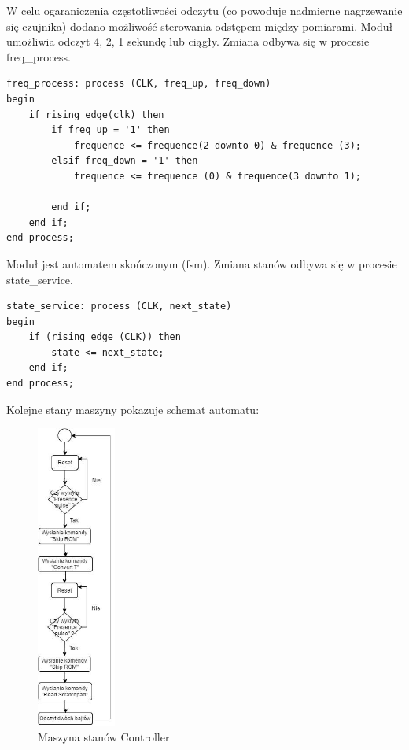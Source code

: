 \documentclass[a4paper]{article}
\begin{document}
W celu ogaraniczenia częstotliwości odczytu (co powoduje nadmierne nagrzewanie się czujnika) dodano możliwość sterowania odstępem między pomiarami. Moduł umożliwia odczyt 4, 2, 1 sekundę lub ciągły. Zmiana odbywa się w procesie freq\_process.

\lstset{language=VHDL}
\begin{lstlisting}[frame=single]
freq_process: process (CLK, freq_up, freq_down)
begin
	if rising_edge(clk) then
		if freq_up = '1' then
			frequence <= frequence(2 downto 0) & frequence (3);
		elsif freq_down = '1' then
			frequence <= frequence (0) & frequence(3 downto 1);

		end if;
	end if;
end process;
\end{lstlisting}

Moduł jest automatem skończonym (fsm). Zmiana stanów odbywa się w procesie  state\_service.

\lstset{language=VHDL}
\begin{lstlisting}[frame=single]
state_service: process (CLK, next_state)
begin
	if (rising_edge (CLK)) then
		state <= next_state;
	end if;
end process;
\end{lstlisting}

Kolejne stany maszyny pokazuje schemat automatu:
\begin{figure}[!h]
\begin{center}
\includegraphics[height=10cm]{graphics/controller_fsm.png}
\end{center}
\caption{Maszyna stanów Controller}
\label{controller_sym}
\end{figure}
\end{document}
